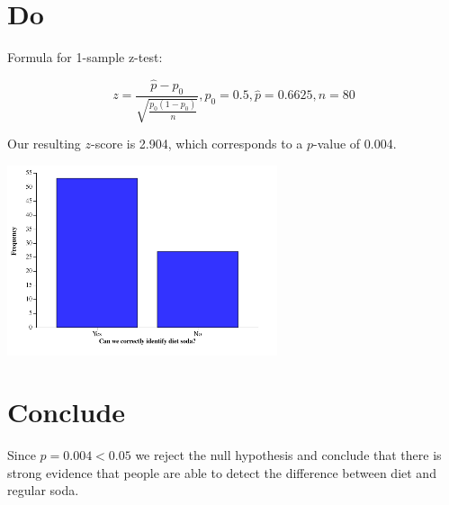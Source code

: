 \documentclass{scrreprt} %
\begin{document}
\section{Do}

Formula for 1-sample z-test:

$$
z=\frac{\hat{p}-p_0}{\sqrt{\frac{p_0(1-p_0)}{n}}}, p_0 = 0.5, \hat{p} = 0.6625, n = 80
$$

Our resulting $z$-score is 2.904, which corresponds to a $p$-value of 0.004.

\includegraphics[width=300px]{2021-08-31-11-24-27.png}

\section{Conclude}

Since $p = 0.004 < 0.05$ we reject the null hypothesis and conclude that there
is strong evidence that people are able to detect the difference between diet
and regular soda.
\end{document}
